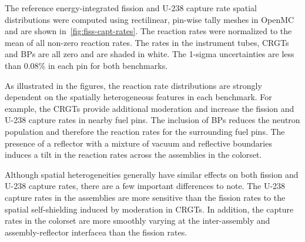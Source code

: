 The reference energy-integrated fission and U-238 capture rate spatial distributions were computed using rectilinear, pin-wise tally meshes in OpenMC and are shown in~\autoref{fig:fiss-capt-rates}. The reaction rates were normalized to the mean of all non-zero reaction rates. The rates in the instrument tubes, CRGTs and BPs are all zero and are shaded in white. The 1-sigma uncertainties are less than 0.08\% in each pin for both benchmarks.


As illustrated in the figures, the reaction rate distributions are strongly dependent on the spatially heterogeneous features in each benchmark. For example, the CRGTs provide additional moderation and increase the fission and U-238 capture rates in nearby fuel pins. The inclusion of BPs reduces the neutron population and therefore the reaction rates for the surrounding fuel pins. The presence of a reflector with a mixture of vacuum and reflective boundaries induces a tilt in the reaction rates across the assemblies in the colorset.

Although spatial heterogeneities generally have similar effects on both fission and U-238 capture rates, there are a few important differences to note. The U-238 capture rates in the assemblies are more sensitive than the fission rates to the spatial self-shielding induced by moderation in CRGTs. In addition, the capture rates in the colorset are more smoothly varying at the inter-assembly and assembly-reflector interfacea than the fission rates.
